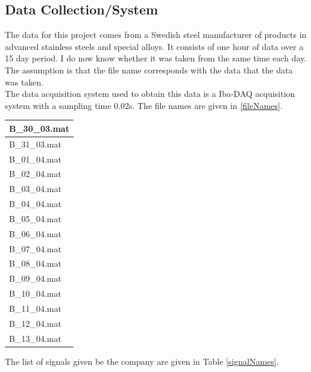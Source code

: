 \documentclass{article}
\begin{document}
\subsection{Data Collection/System}
The data for this project comes from a Swedish steel manufacturer of products in advanced stainless steels and special alloys.
It consists of one hour of data over a 15 day period. I do now know whether it was taken from the same time each day. The assumption is that the file name corresponds with the data that the data was taken.\\
The data acquisition system used to obtain this data is a Iba-DAQ acquisition system with a sampling time 0.02s. 
The file names are given in \ref{fileNames}.
\begin{center}
\begin{tabular}{ |l| } 
 \hline
 B\_30\_03.mat \\
 \hline 
 B\_31\_03.mat \\
 \hline 
 B\_01\_04.mat \\
 \hline 
 B\_02\_04.mat \\
 \hline
 B\_03\_04.mat \\
 \hline 
 B\_04\_04.mat \\
 \hline 
 B\_05\_04.mat \\
 \hline
 B\_06\_04.mat \\
 \hline 
 B\_07\_04.mat \\
 \hline 
 B\_08\_04.mat \\
 \hline 
 B\_09\_04.mat \\
 \hline 
 B\_10\_04.mat \\
 \hline
 B\_11\_04.mat \\
 \hline 
 B\_12\_04.mat \\
 \hline
 B\_13\_04.mat \\
 \hline
\end{tabular}
\label{fileNames}
\end{center}
The list of signals given be the company are given in Table \ref{signalNames}.
\end{document}
